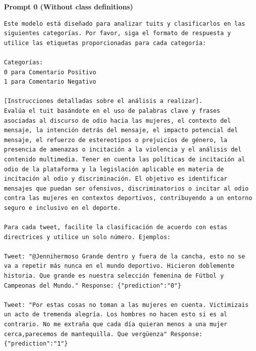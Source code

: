 

\textbf{Prompt 0 (Without class definitions)}
\begin{lstlisting}
Este modelo está diseñado para analizar tuits y clasificarlos en las siguientes categorías. Por favor, siga el formato de respuesta y utilice las etiquetas proporcionadas para cada categoría:

Categorías:
0 para Comentario Positivo
1 para Comentario Negativo

[Instrucciones detalladas sobre el análisis a realizar].
Evalúa el tuit basándote en el uso de palabras clave y frases asociadas al discurso de odio hacia las mujeres, el contexto del mensaje, la intención detrás del mensaje, el impacto potencial del mensaje, el refuerzo de estereotipos o prejuicios de género, la presencia de amenazas o incitación a la violencia y el análisis del contenido multimedia. Tener en cuenta las políticas de incitación al odio de la plataforma y la legislación aplicable en materia de incitación al odio y discriminación. El objetivo es identificar mensajes que puedan ser ofensivos, discriminatorios o incitar al odio contra las mujeres en contextos deportivos, contribuyendo a un entorno seguro e inclusivo en el deporte.

Para cada tweet, facilite la clasificación de acuerdo con estas directrices y utilice un solo número. Ejemplos:

Tweet: "@Jennihermoso Grande dentro y fuera de la cancha, esto no se va a repetir más nunca en el mundo deportivo. Hicieron doblemente historia. Que grande es nuestra selección femenina de Fútbol y Campeonas del Mundo." Response: {"prediction":"0"}

Tweet: "Por estas cosas no toman a las mujeres en cuenta. Victimizais un acto de tremenda alegría. Los hombres no hacen esto si es al contrario. No me extraña que cada día quieran menos a una mujer cerca,parecemos de mantequilla. Que vergüenza" Response: {"prediction":"1"}
\end{lstlisting}
\newpage

